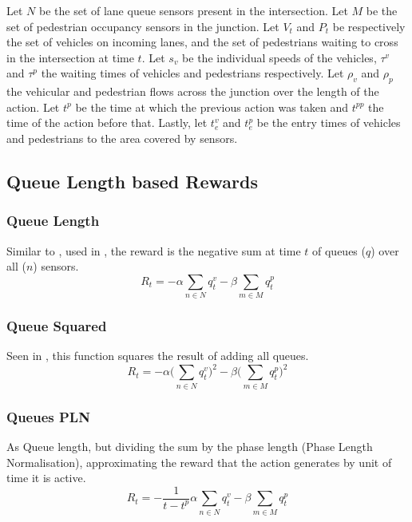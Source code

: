 \documentclass[conference]{IEEEtran}
\begin{document}
Let $N$ be the set of lane queue sensors present in the intersection.
Let $M$ be the set of pedestrian occupancy sensors in the junction.
Let $V_t$ and $P_t$ be respectively the set of vehicles on incoming lanes, and the set of pedestrians waiting to cross in the intersection at time $t$. 
Let $s_v$ be the individual speeds of the vehicles, $\tau^v$ and $\tau^p$ the waiting times of vehicles and pedestrians respectively.
Let $\rho_v$ and $\rho_p$ the vehicular and pedestrian flows across the junction over the length of the action.
Let $t^p$ be the time at which the previous action was taken and $t^{pp}$ the time of the action before that.
Lastly, let $t^v_e$ and $t^p_e$ be the entry times of vehicles and pedestrians to the area covered by sensors. 

\subsection{Queue Length based Rewards}
\subsubsection{Queue Length}
Similar to \cite{pra2010}, used in \cite{aslani2019}, the reward is the negative sum at time $t$ of queues ($q$) over all ($n$) sensors.
\begin{equation}
    R_t = - \alpha \sum_{n \in N} q^v_{t} - \beta \sum_{m \in M} q^p_{t}
\label{eq:queue}
\end{equation}

\subsubsection{Queue Squared}
Seen in \cite{gendersthesis}, this function squares the result of adding all queues.
\begin{equation}
   R_t = - \alpha \bigg( \sum_{n \in N} q^v_{t} \bigg)^2 - \beta \bigg( \sum_{m \in M} q^p_{t} \bigg)^2
\label{eq:queuesq} 
\end{equation}

\subsubsection{Queues PLN}
As Queue length, but dividing the sum by the phase length (Phase Length Normalisation), approximating the reward that the action generates by unit of time it is active.
\begin{equation}
    R_t = - \frac{1}{t-t^p} \alpha \sum_{n \in N} q^v_{t} - \beta \sum_{m \in M} q^p_{t}
    \label{queuepln}
\end{equation}
\end{document}
